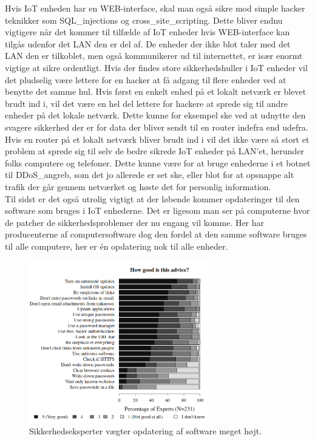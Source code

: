     Hvis IoT enheden har en WEB-interface, skal man også sikre mod simple hacker teknikker som \Glspl{SQL_injection} og \gls{cross_site_scripting}. Dette bliver endnu vigtigere når det kommer til tilfælde af IoT enheder hvis WEB-interface kan tilgås udenfor det LAN 
    den er del af. De enheder der ikke blot taler med det LAN den er tilkoblet, men også kommunikerer ud til internettet, er især enormt vigtige at sikre ordentligt. 
    Hvis der findes store sikkerhedshuller i IoT enheder vil det pludselig være lettere for en hacker at få adgang til flere enheder ved at benytte det samme hul. Hvis først en enkelt enhed på et lokalt netværk er blevet brudt ind i, vil det være en hel del lettere for hackere at sprede sig til andre enheder på det lokale netværk. 
    Dette kunne for eksempel ske ved at udnytte den svagere sikkerhed der er for data der bliver sendt til en router indefra end udefra. Hvis en router på et lokalt netværk bliver brudt ind i vil det ikke være så stort et problem at sprede sig til selv de bedre sikrede IoT enheder på LAN'et, herunder folks computere og telefoner. Dette kunne være for at bruge enhederne i et \gls{botnet} til \Gls{DDoS_angreb}, som det jo allerede er set ske, eller blot for at opsnappe alt trafik der går gennem netværket og høste det for personlig information.\\
    Til sidst er det også utrolig vigtigt at der løbende kommer opdateringer til den software som bruges i IoT enhederne. Det er ligesom man ser på computerne hvor de patcher de sikkerhedsproblemer der nu engang vil komme. Her har producenterne af computersoftware dog den fordel at den samme software bruges til alle computere, her er én opdatering nok til alle enheder. \\
    \begin{figure}[H]
        \centering
            \includegraphics[width=0.7\textwidth]{figures/importance_of_updates.png}
        \caption{Sikkerhedseksperter vægter opdatering af software meget højt.\autocite{soups2015}}\label{fig:updates}
    \end{figure}
